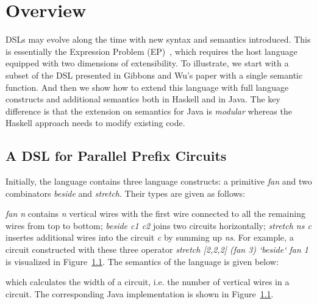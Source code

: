 \section{Overview}

\begin{comment}
Weixin writes this one.

Go over jeremy's examples, maybe having only 3 diagram 
constructs instead of 5 for space reasons.

Use five constructs to show extensibility.

Think of how to introduce our tool? Using the Jeremy's examples? 
or introducing before with some other examples?

\end{comment}

DSLs may evolve along the time with new syntax and semantics introduced.
This is essentially the Expression Problem (EP)~\cite{wadler}, which requires
the host language equipped with two dimensions of extensibility.
To illustrate, we start with a subset of the DSL presented in Gibbons and Wu's
paper with a single semantic function. And then we show how to extend this
language with full language constructs and additional semantics both in Haskell
and in Java. The key difference is that the extension on semantics for Java is
\emph{modular} whereas the Haskell approach needs to modify existing code.

\subsection{A DSL for Parallel Prefix Circuits}
Initially, the language contains three language constructs: a primitive
\emph{fan} and two combinators \emph{beside} and \emph{stretch}. Their types are
given as follows:

\emph{fan n} contains \emph{n} vertical wires with the first wire connected to
all the remaining wires from top to bottom; \emph{beside c1 c2} joins two circuits
horizontally; \emph{stretch ns c} insertes additional wires into the circuit
\emph{c} by summing up \emph{ns}.
For example, a circuit constructed with these three operator \emph{stretch [2,2,2] (fan 3) `beside` fan 1} is visualized in Figure~\ref{}.
The semantics of the language is given below:

which calculates the width of a circuit, i.e. the number of vertical wires in a circuit.
The corresponding Java implementation is shown in Figure~\ref{}.

